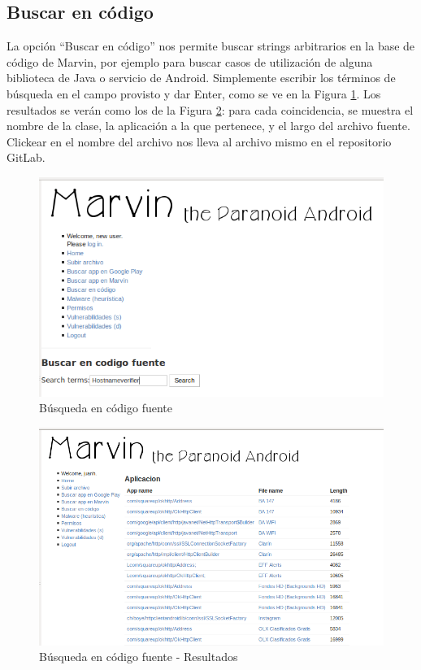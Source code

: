 \documentclass[11pt]{article}
\begin{document}
\subsection{Buscar en código}
La opción ``Buscar en código'' nos permite buscar strings arbitrarios en la base de código de Marvin, por ejemplo para buscar casos de utilización de alguna biblioteca de Java o servicio de Android. Simplemente escribir los términos de búsqueda en el campo provisto y dar Enter, como se ve en la Figura \ref{ssource1}. Los resultados se verán como los de la Figura \ref{ssource2}: para cada coincidencia, se muestra el nombre de la clase, la aplicación a la que pertenece, y el largo del archivo fuente. Clickear en el nombre del archivo nos lleva al archivo mismo en el repositorio GitLab.
\begin{figure}[H]
\begin{center}
\includegraphics[width=\textwidth]{graphics/marvin_searchsource1.png}
\caption{Búsqueda en código fuente} \label{ssource1}
\end{center}
\end{figure}

\begin{figure}[H]
\begin{center}
\includegraphics[width=\textwidth]{graphics/marvin_searchsource2.png}
\caption{Búsqueda en código fuente - Resultados} \label{ssource2}
\end{center}
\end{figure}
\end{document}
